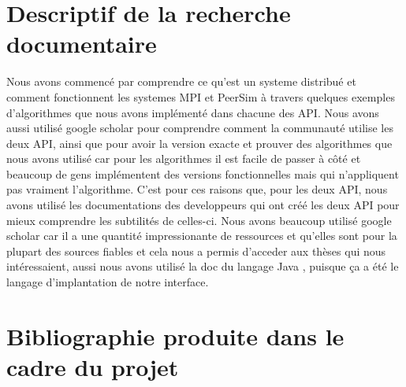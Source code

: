 \documentclass{article}
\begin{document}
		\section{Descriptif de la recherche documentaire}
		\indent Nous avons commencé par comprendre ce qu'est un systeme distribué et comment fonctionnent les systemes MPI et PeerSim à travers quelques exemples d'algorithmes que nous avons implémenté dans chacune des API. 
		\newline
		\indent	
Nous avons aussi utilisé google scholar pour comprendre comment la communauté utilise les deux API, ainsi que pour avoir la version exacte et prouver des algorithmes que nous avons utilisé car pour les algorithmes il est facile de passer à côté et beaucoup de gens implémentent des versions fonctionnelles mais qui n'appliquent pas vraiment l'algorithme.
		\newline
		\indent
 C'est pour ces raisons que, pour les deux API, nous avons utilisé les documentations des developpeurs qui ont créé les deux API pour mieux comprendre les subtilités de celles-ci.
		\newline
		\indent Nous avons beaucoup utilisé google scholar car il a une quantité impressionante de ressources et qu'elles sont pour la plupart des sources fiables et cela nous a permis d'acceder aux thèses qui nous intéressaient, aussi nous avons utilisé la doc du langage Java , puisque ça a été le langage d'implantation de notre interface.

		
		\section{Bibliographie produite dans le cadre du projet}
\end{document}
